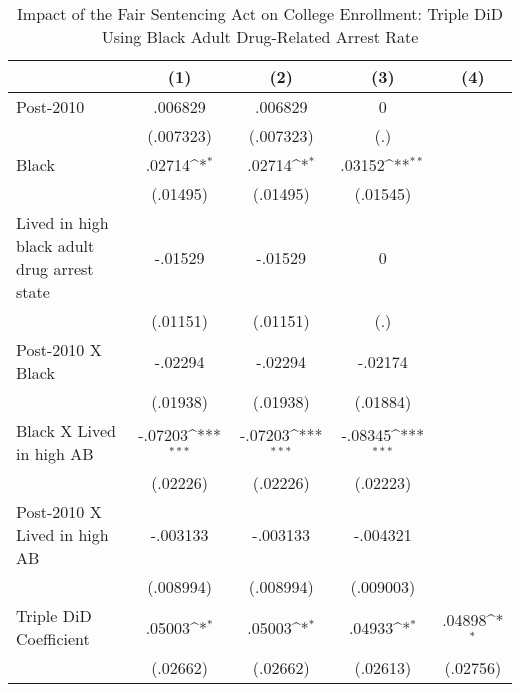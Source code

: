 \begin{table}[htbp]\centering
\def\sym#1{\ifmmode^{#1}\else\(^{#1}\)\fi}
\caption{Impact of the Fair Sentencing Act on College Enrollment: Triple DiD Using Black Adult Drug-Related Arrest Rate}
\begin{tabular}{l*{4}{c}}
\hline\hline
                    &\multicolumn{1}{c}{(1)}         &\multicolumn{1}{c}{(2)}         &\multicolumn{1}{c}{(3)}         &\multicolumn{1}{c}{(4)}         \\
\hline
Post-2010           &     .006829         &     .006829         &           0         &                     \\
                    &   (.007323)         &   (.007323)         &         (.)         &                     \\
[1em]
Black               &      .02714\sym{*}  &      .02714\sym{*}  &      .03152\sym{**} &                     \\
                    &    (.01495)         &    (.01495)         &    (.01545)         &                     \\
[1em]
Lived in high black adult drug arrest state&     -.01529         &     -.01529         &           0         &                     \\
                    &    (.01151)         &    (.01151)         &         (.)         &                     \\
[1em]
Post-2010 X Black   &     -.02294         &     -.02294         &     -.02174         &                     \\
                    &    (.01938)         &    (.01938)         &    (.01884)         &                     \\
[1em]
Black X Lived in high AB&     -.07203\sym{***}&     -.07203\sym{***}&     -.08345\sym{***}&                     \\
                    &    (.02226)         &    (.02226)         &    (.02223)         &                     \\
[1em]
Post-2010 X Lived in high AB&    -.003133         &    -.003133         &    -.004321         &                     \\
                    &   (.008994)         &   (.008994)         &   (.009003)         &                     \\
[1em]
Triple DiD Coefficient&      .05003\sym{*}  &      .05003\sym{*}  &      .04933\sym{*}  &      .04898\sym{*}  \\
                    &    (.02662)         &    (.02662)         &    (.02613)         &    (.02756)         \\

\end{tabular}
\end{table}
